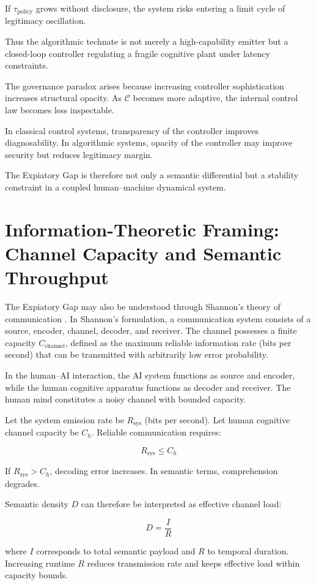 \documentclass[12pt]{article}
\begin{document}
If $\tau_{\text{policy}}$ grows without disclosure, the system risks entering a limit cycle of legitimacy oscillation.

Thus the algorithmic technate is not merely a high-capability emitter but a closed-loop controller regulating a fragile cognitive plant under latency constraints.

The governance paradox arises because increasing controller sophistication increases structural opacity. As $\mathcal{C}$ becomes more adaptive, the internal control law becomes less inspectable.

In classical control systems, transparency of the controller improves diagnosability. In algorithmic systems, opacity of the controller may improve security but reduces legitimacy margin.

The Expiatory Gap is therefore not only a semantic differential but a stability constraint in a coupled human–machine dynamical system.

\section{Information-Theoretic Framing: Channel Capacity and Semantic Throughput}

The Expiatory Gap may also be understood through Shannon’s theory of communication \cite{Shannon1948}. In Shannon’s formulation, a communication system consists of a source, encoder, channel, decoder, and receiver. The channel possesses a finite capacity $C_{\text{channel}}$, defined as the maximum reliable information rate (bits per second) that can be transmitted with arbitrarily low error probability.

In the human–AI interaction, the AI system functions as source and encoder, while the human cognitive apparatus functions as decoder and receiver. The human mind constitutes a noisy channel with bounded capacity.

Let the system emission rate be $R_{\text{sys}}$ (bits per second). Let human cognitive channel capacity be $C_h$. Reliable communication requires:

\[
R_{\text{sys}} \le C_h
\]

If $R_{\text{sys}} > C_h$, decoding error increases. In semantic terms, comprehension degrades.

Semantic density $D$ can therefore be interpreted as effective channel load:

\[
D = \frac{I}{R}
\]

where $I$ corresponds to total semantic payload and $R$ to temporal duration. Increasing runtime $R$ reduces transmission rate and keeps effective load within capacity bounds.
\end{document}
